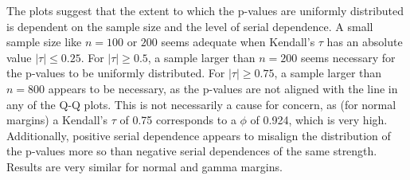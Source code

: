 \documentclass[12pt]{article}
\begin{document}
The plots suggest that the extent to which the p-values are uniformly
distributed is dependent on the sample size and the level of serial dependence.
A small sample size like $n = 100$ or $200$ seems adequate when Kendall's
$\tau$ has an absolute value $|\tau| \leq 0.25$. For $|\tau| \geq 0.5$, 
a sample larger than
$n = 200$ seems necessary for the p-values to be uniformly distributed. For
$|\tau| \geq 0.75$, a sample larger than $n = 800$ appears to be
necessary, as the p-values are not aligned with the line in any of the Q-Q
plots. This is not necessarily a cause for concern, as (for normal margins)
a Kendall's $\tau$ of 0.75 corresponds to a $\phi$ of 0.924, which is very high.
Additionally, positive serial dependence appears to misalign the distribution
of the p-values more so than negative serial dependences of the same strength.
Results are very similar for normal and gamma margins.
\end{document}

